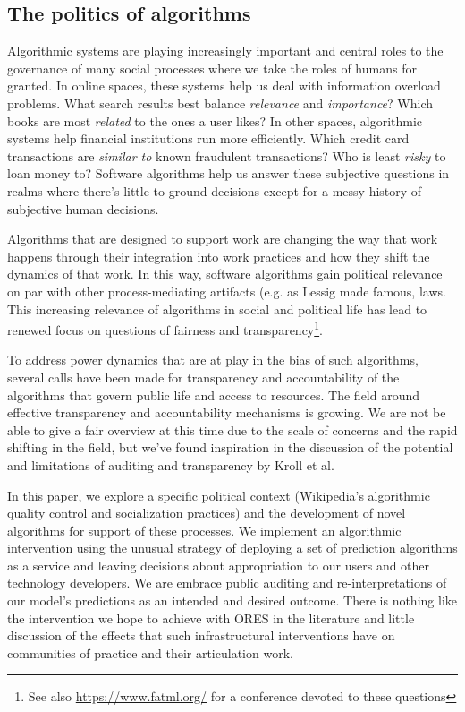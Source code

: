 \subsection{The politics of algorithms}
Algorithmic systems are playing increasingly important and central roles to the governance of many social processes where we take the roles of humans for granted\cite{gillespie2014relevance}.  In online spaces, these systems help us deal with information overload problems.  What search results best balance \emph{relevance} and \emph{importance}?  Which books are most \emph{related} to the ones a user likes?  In other spaces, algorithmic systems help financial institutions run more efficiently.  Which credit card transactions are \emph{similar to} known fraudulent transactions?  Who is least \emph{risky} to loan money to?  Software algorithms help us answer these subjective questions in realms where there's little to ground decisions except for a messy history of subjective human decisions\cite{tufekci2015algorithms}.  

Algorithms that are designed to support work are changing the way that work happens through their integration into work practices and how they shift the dynamics of that work\cite{crawford2016algorithm}\cite{gillespie2014relevance}.  In this way, software algorithms gain political relevance on par with other process-mediating artifacts (e.g. as Lessig made famous, laws\cite{lessig1999code}.  This increasing relevance of algorithms in social and political life has lead to renewed focus on questions of fairness and transparency\footnote{See also \url{https://www.fatml.org/} for a conference devoted to these questions}.

To address power dynamics that are at play in the bias of such algorithms, several calls have been made for transparency and accountability of the algorithms that govern public life and access to resources\cite{diakopoulos2015algorithmic}\cite{sandvig2014auditing}\cite{kroll2016accountable}.  The field around effective transparency and accountability mechanisms is growing.  We are not be able to give a fair overview at this time due to the scale of concerns and the rapid shifting in the field, but we've found inspiration in the discussion of the potential and limitations of auditing and transparency by Kroll et al.\cite{kroll2016accountable}

In this paper, we explore a specific political context (Wikipedia's algorithmic quality control and socialization practices) and the development of novel algorithms for support of these processes.  We implement an algorithmic intervention using the unusual strategy of deploying a set of prediction algorithms as a service and leaving decisions about appropriation to our users and other technology developers.  We are embrace public auditing and re-interpretations of our model's predictions as an intended and desired outcome.  There is nothing like the intervention we hope to achieve with ORES in the literature and little discussion of the effects that such infrastructural interventions have on communities of practice and their articulation work.

